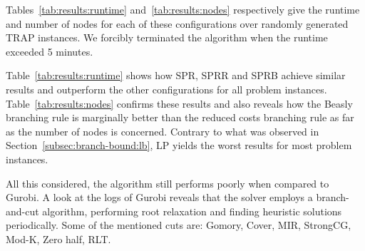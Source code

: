 \documentclass[runningheads]{llncs}
\begin{document}
Tables~\ref{tab:results:runtime} and~\ref{tab:results:nodes} respectively give the runtime and number of nodes for each of these configurations over randomly generated TRAP instances. We forcibly terminated the algorithm when the runtime exceeded 5 minutes. 

Table~\ref{tab:results:runtime} shows how SPR, SPRR and SPRB achieve similar results and outperform the other configurations for all problem instances. Table~\ref{tab:results:nodes} confirms these results and also reveals how the Beasly branching rule is marginally better than the reduced costs branching rule as far as the number of nodes is concerned. Contrary to what was observed in Section~\ref{subsec:branch-bound:lb}, LP yields the worst results for most problem instances. 

All this considered, the algorithm still performs poorly when compared to Gurobi. A look at the logs of Gurobi reveals that the solver employs a branch-and-cut algorithm, performing root relaxation and finding heuristic solutions periodically. Some of the mentioned cuts are: Gomory, Cover, MIR, StrongCG, Mod-K, Zero half, RLT.
\end{document}
